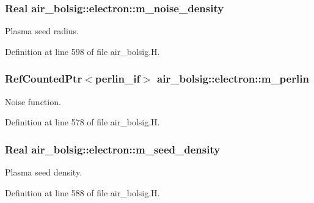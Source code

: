 \subsubsection[{\texorpdfstring{m\+\_\+noise\+\_\+density}{m_noise_density}}]{\setlength{\rightskip}{0pt plus 5cm}Real air\+\_\+bolsig\+::electron\+::m\+\_\+noise\+\_\+density}\hypertarget{classair__bolsig_1_1electron_a1bc877e409899ca12fcdf3eeec33dc49}{}\label{classair__bolsig_1_1electron_a1bc877e409899ca12fcdf3eeec33dc49}


Plasma seed radius. 



Definition at line 598 of file air\+\_\+bolsig.\+H.

\subsubsection[{\texorpdfstring{m\+\_\+perlin}{m_perlin}}]{\setlength{\rightskip}{0pt plus 5cm}Ref\+Counted\+Ptr$<${\bf perlin\+\_\+if}$>$ air\+\_\+bolsig\+::electron\+::m\+\_\+perlin}\hypertarget{classair__bolsig_1_1electron_a133dbcaca57cd676331cedd747d58b21}{}\label{classair__bolsig_1_1electron_a133dbcaca57cd676331cedd747d58b21}


Noise function. 



Definition at line 578 of file air\+\_\+bolsig.\+H.

\subsubsection[{\texorpdfstring{m\+\_\+seed\+\_\+density}{m_seed_density}}]{\setlength{\rightskip}{0pt plus 5cm}Real air\+\_\+bolsig\+::electron\+::m\+\_\+seed\+\_\+density}\hypertarget{classair__bolsig_1_1electron_ab1b60d6f55fa34c1253a3f48dc80fbc3}{}\label{classair__bolsig_1_1electron_ab1b60d6f55fa34c1253a3f48dc80fbc3}


Plasma seed density. 



Definition at line 588 of file air\+\_\+bolsig.\+H.


